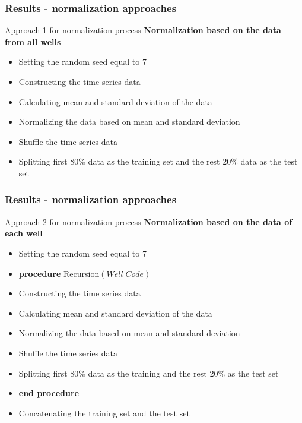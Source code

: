 \documentclass[xcolor=table]{beamer}
\begin{document}
\begin{frame}
\frametitle{Results - normalization approaches}

\begin{block}{Approach 1 for normalization process}
\textbf{Normalization based on the data from all wells}
\begin{itemize}
\item Setting the random seed equal to 7
\item Constructing the time series data
\item Calculating mean and standard deviation of the data
\item Normalizing the data based on mean and standard deviation
\item Shuffle the time series data
\item Splitting first 80\% data as the training set and the rest 20\% data as the test set
\end{itemize}

\end{block}

\end{frame}


\begin{frame}
\frametitle{Results - normalization approaches}

\begin{block}{Approach 2 for normalization process}
\textbf{Normalization based on the data of each well}
\begin{itemize}
\item Setting the random seed equal to 7
\item \textbf{procedure} Recursion$(Well\;Code)$
\item \hspace{5mm} Constructing the time series data
\item \hspace{5mm} Calculating mean and standard deviation of the data
\item \hspace{5mm} Normalizing the data based on mean and standard deviation
\item \hspace{5mm} Shuffle the time series data
\item \hspace{5mm} Splitting first 80\% data as the training and the rest 20\% as the test set
\item  \textbf{end procedure} 
\item Concatenating the training set and the test set
\end{itemize}

\end{block}

\end{frame}
\end{document}

